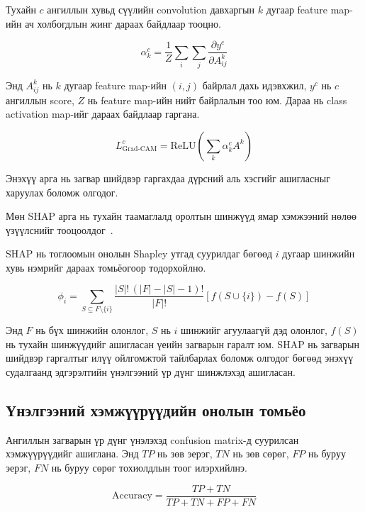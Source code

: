 Тухайн $c$ ангиллын хувьд сүүлийн convolution давхаргын $k$ дугаар feature map-ийн ач холбогдлын жинг дараах байдлаар тооцно.

\begin{equation}
    \alpha_k^c = \frac{1}{Z}\sum_i\sum_j
    \frac{\partial y^c}{\partial A_{ij}^{k}}
    \label{eq:gradcam_weight}
\end{equation}

Энд $A_{ij}^{k}$ нь $k$ дугаар feature map-ийн $(i,j)$ байрлал дахь идэвхжил, $y^c$ нь $c$ ангиллын score, $Z$ нь feature map-ийн нийт байрлалын тоо юм. Дараа нь class activation map-ийг дараах байдлаар гаргана.

\begin{equation}
    L_{\mathrm{Grad\text{-}CAM}}^{c} =
    \mathrm{ReLU}\left(\sum_k \alpha_k^c A^k\right)
    \label{eq:gradcam_map}
\end{equation}

Энэхүү арга нь загвар шийдвэр гаргахдаа дүрсний аль хэсгийг ашигласныг харуулах боломж олгодог.

Мөн SHAP арга нь тухайн таамаглалд оролтын шинжүүд ямар хэмжээний нөлөө үзүүлснийг тооцоолдог~\cite{ref36}.

SHAP нь тоглоомын онолын Shapley утгад суурилдаг бөгөөд $i$ дугаар шинжийн хувь нэмрийг дараах томьёогоор тодорхойлно.

\begin{equation}
    \phi_i =
    \sum_{S \subseteq F \setminus \{i\}}
    \frac{|S|!\,(|F|-|S|-1)!}{|F|!}
    \left[f(S \cup \{i\}) - f(S)\right]
    \label{eq:shap}
\end{equation}

Энд $F$ нь бүх шинжийн олонлог, $S$ нь $i$ шинжийг агуулаагүй дэд олонлог, $f(S)$ нь тухайн шинжүүдийг ашигласан үеийн загварын гаралт юм. SHAP нь загварын шийдвэр гаргалтыг илүү ойлгомжтой тайлбарлах боломж олгодог бөгөөд энэхүү судалгаанд эдгэрэлтийн үнэлгээний үр дүнг шинжлэхэд ашигласан.

\subsection*{Үнэлгээний хэмжүүрүүдийн онолын томьёо}

Ангиллын загварын үр дүнг үнэлэхэд confusion matrix-д суурилсан хэмжүүрүүдийг ашиглана. Энд $TP$ нь зөв эерэг, $TN$ нь зөв сөрөг, $FP$ нь буруу эерэг, $FN$ нь буруу сөрөг тохиолдлын тоог илэрхийлнэ.

\begin{equation}
    \mathrm{Accuracy} = \frac{TP + TN}{TP + TN + FP + FN}
    \label{eq:accuracy}
\end{equation}

